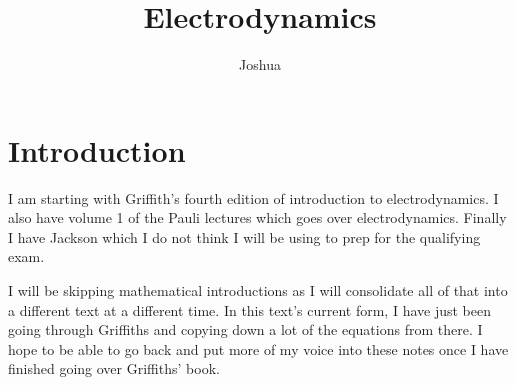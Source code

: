 \documentclass[preprint, review,12pt]{elsarticle}
\begin{document}
\begin{frontmatter}



\title{Electrodynamics}


\author{Joshua}



\end{frontmatter}



\tableofcontents

\section{Introduction}

I am starting with Griffith's fourth edition of introduction to electrodynamics. I also have volume 1 of the Pauli lectures which goes over electrodynamics. Finally I have Jackson which I do not think I will be using to prep for the qualifying exam. \cite{GriffithsEM} \cite{PauliEM} \cite{Jackson}

I will be skipping mathematical introductions as I will consolidate all of that into a different text at a different time. In this text's current form, I have just been going through Griffiths and copying down a lot of the equations from there. I hope to be able to go back and put more of my voice into these notes once I have finished going over Griffiths' book.
\end{document}
